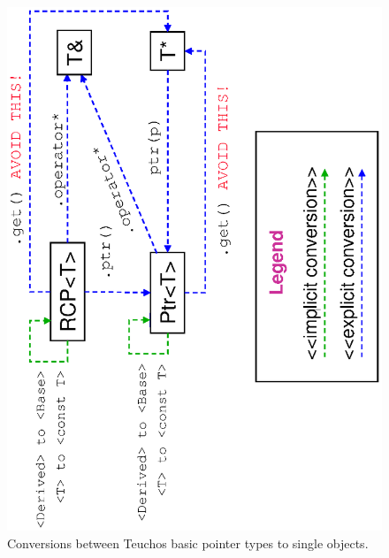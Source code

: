 \begin{itemize}
{\bsinglespace
\begin{figure}[p]
\begin{center}
\includegraphics*[angle=270,scale=0.65]{TeuchosPtrConversions}
\end{center}
\caption{
\label{TeuchosPtrConversions}
Conversions between Teuchos basic pointer types to single objects.  }
\end{figure}
\esinglespace}



\end{itemize}

